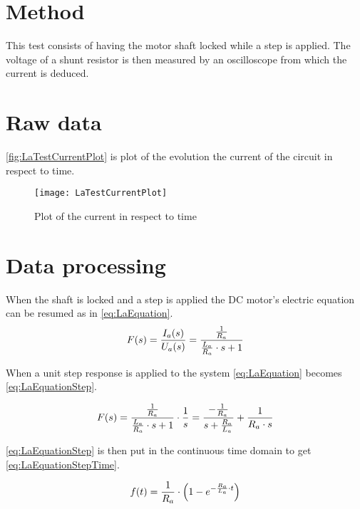 \section*{Method}
This test consists of having the motor shaft locked while a step is applied. The voltage of a shunt resistor is then measured by an oscilloscope from which the current is deduced.
\section*{Raw data}
\autoref{fig:LaTestCurrentPlot} is plot of the evolution the current of the circuit in respect to time.

\begin{figure}[htbp]
	\centering
	\texttt{[image: LaTestCurrentPlot]}
	\caption{Plot of the current in respect to time}\label{fig:LaTestCurrentPlot}
\end{figure}

\section*{Data processing}
When the shaft is locked and a step is applied the DC motor's electric equation can be resumed as in \autoref{eq:LaEquation}.
\begin{equation}
	F(s)=\frac{I_a(s)}{U_a(s)}=\frac{\frac{1}{R_a}}{\frac{L_a}{R_a}\cdot s+1} \addunit{1}
	\label{eq:LaEquation}
\end{equation}
\startexplain
{}
\stopexplain

When a unit step response is applied to the system \autoref{eq:LaEquation} becomes \autoref{eq:LaEquationStep}.

\begin{equation}
F(s)=\frac{\frac{1}{R_a}}{\frac{L_a}{R_a}\cdot s+1}\cdot\frac{1}{s}=\frac{-\frac{1}{R_a}}{s+\frac{R_a}{L_a}}+\frac{1}{R_a\cdot s} \addunit{1}
\label{eq:LaEquationStep}
\end{equation}

\autoref{eq:LaEquationStep} is then put in the continuous time domain to get \autoref{eq:LaEquationStepTime}.

\begin{equation}
f(t)= \frac{1}{R_a}\cdot \left(1-e^{-\frac{R_a}{L_a}\cdot t}\right) \addunit{1}
\label{eq:LaEquationStepTime}
\end{equation}

